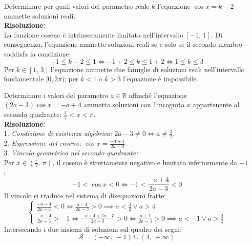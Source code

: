 \documentclass[11pt,a4paper,oneside]{report}
\begin{document}
\begin{esercizio}
Determinare per quali valori del parametro reale $k$ l'equazione $\cos x = k - 2$ ammette soluzioni reali.\\
\textbf{Risoluzione:}\\
La funzione coseno \`e intrinsecamente limitata nell'intervallo $[-1, \, 1]$. Di conseguenza, l'equazione ammette soluzioni reali se e solo se il secondo membro soddisfa la condizione:
\begin{equation}
-1 \le k - 2 \le 1 \iff -1 + 2 \le k \le 1 + 2 \iff 1 \le k \le 3
\end{equation}
Per $k \in [1, \, 3]$ l'equazione ammette due famiglie di soluzioni reali nell'intervallo fondamentale $[0, 2\pi)$; per $k < 1$ o $k > 3$ l'equazione \`e impossibile.
\end{esercizio}

\begin{esercizio}
Determinare i valori del parametro $a \in \mathbb{R}$ affinch\'e l'equazione $(2a - 3)\cos x = -a + 4$ ammetta soluzioni con l'incognita $x$ appartenente al secondo quadrante: $\frac{\pi}{2} < x < \pi$.\\
\textbf{Risoluzione:}\\
1. \textit{Condizione di esistenza algebrica:} $2a - 3 \neq 0 \iff a \neq \frac{3}{2}$.\\
2. \textit{Espressione del coseno:} $\cos x = \frac{-a + 4}{2a - 3}$.\\
3. \textit{Vincolo geometrico nel secondo quadrante:}\\
Per $x \in \left(\frac{\pi}{2}, \, \pi\right)$, il coseno \`e strettamente negativo e limitato inferiormente da $-1$:
\begin{equation}
-1 < \cos x < 0 \iff -1 < \frac{-a + 4}{2a - 3} < 0
\end{equation}
Il vincolo si traduce nel sistema di disequazioni fratte:
\begin{equation}
\begin{cases}
\frac{-a + 4}{2a - 3} < 0 \iff \frac{a - 4}{2a - 3} > 0 \implies a < \frac{3}{2} \lor a > 4\\[6pt]
\frac{-a + 4}{2a - 3} > -1 \iff \frac{-a + 4 + 2a - 3}{2a - 3} > 0 \iff \frac{a + 1}{2a - 3} > 0 \implies a < -1 \lor a > \frac{3}{2}
\end{cases}
\end{equation}
Intersecando i due insiemi di soluzioni sul quadro dei segni:
\begin{equation}
\mathcal{S} = (-\infty, \, -1) \cup (4, \, +\infty)
\end{equation}
\end{esercizio}
\end{document}
